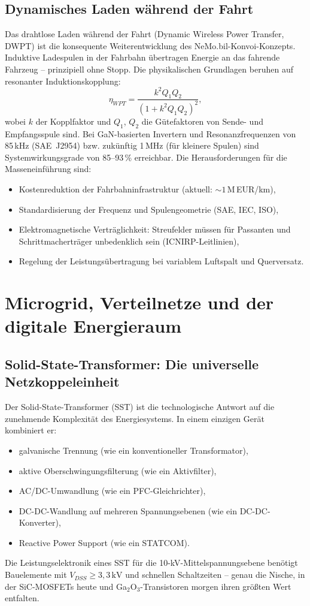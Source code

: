 ﻿\documentclass[a4paper,12pt,openany,oneside]{book}
\newcommand{\abschnitt}[1]{\section{#1}}
\newcommand{\unterabschnitt}[1]{\subsection{#1}}
\theoremstyle{definition}
\begin{document}
\unterabschnitt{Dynamisches Laden w\"ahrend der Fahrt}

Das drahtlose Laden w\"ahrend der Fahrt (Dynamic Wireless Power Transfer, DWPT) ist die
konsequente Weiterentwicklung des NeMo.bil-Konvoi-Konzepts. Induktive Ladespulen in der
Fahrbahn \"ubertragen Energie an das fahrende Fahrzeug -- prinzipiell ohne Stopp. Die
physikalischen Grundlagen beruhen auf resonanter Induktionskopplung:
\[
  \eta_{WPT} = \frac{k^2 Q_1 Q_2}{(1 + k^2 Q_1 Q_2)^2},
\]
wobei $k$ der Kopplfaktor und $Q_1$, $Q_2$ die G\"utefaktoren von Sende- und Empfangsspule
sind. Bei GaN-basierten Invertern und Resonanzfrequenzen von 85\,kHz (SAE~J2954) bzw.
zuk\"unftig 1\,MHz (f\"ur kleinere Spulen) sind Systemwirkungsgrade von 85--93\,\% erreichbar.
Die Herausforderungen f\"ur die Masseneinf\"uhrung sind:
\begin{itemize}
  \item Kostenreduktion der Fahrbahninfrastruktur (aktuell: $\sim 1$\,M\,EUR/km),
  \item Standardisierung der Frequenz und Spulengeometrie (SAE, IEC, ISO),
  \item Elektromagnetische Vertr\"aglichkeit: Streufelder m\"ussen f\"ur Passanten und
    Schrittmachertr\"ager unbedenklich sein (ICNIRP-Leitlinien),
  \item Regelung der Leistungs\"ubertragung bei variablem Luftspalt und Querversatz.
\end{itemize}

\abschnitt{Microgrid, Verteilnetze und der digitale Energieraum}

\unterabschnitt{Solid-State-Transformer: Die universelle Netzkoppeleinheit}

Der Solid-State-Transformer (SST) ist die technologische Antwort auf die zunehmende
Komplexit\"at des Energiesystems. In einem einzigen Ger\"at kombiniert er:
\begin{itemize}
  \item galvanische Trennung (wie ein konventioneller Transformator),
  \item aktive Oberschwingungsfilterung (wie ein Aktivfilter),
  \item AC/DC-Umwandlung (wie ein PFC-Gleichrichter),
  \item DC-DC-Wandlung auf mehreren Spannungsebenen (wie ein DC-DC-Konverter),
  \item Reactive Power Support (wie ein STATCOM).
\end{itemize}
Die Leistungselektronik eines SST f\"ur die 10-kV-Mittelspannungsebene ben\"otigt
Bauelemente mit $V_{DSS} \geq 3{,}3\,\mathrm{kV}$ und schnellen Schaltzeiten -- genau
die Nische, in der SiC-MOSFETs heute und Ga$_2$O$_3$-Transistoren morgen ihren gr\"o\ss{}ten
Wert entfalten.
\end{document}
